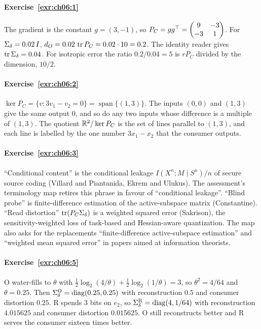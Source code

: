 
\paragraph{Exercise~\ref{exr:ch06:1}}
The gradient is the constant $g=(3,-1)$, so $P_C=gg^{\top}=\begin{pmatrix}9&-3\\-3&1\end{pmatrix}$. For $\Sigma_\delta=0.02\,I$, $d_O=0.02\,\operatorname{tr} P_C=0.02\cdot10=0.2$. The identity reader gives $\operatorname{tr}\Sigma_\delta=0.04$. For isotropic error the ratio $0.2/0.04=5$ is $	r P_C$ divided by the dimension, $10/2$.

\paragraph{Exercise~\ref{exr:ch06:2}}
$\ker P_C=\{v: 3v_1-v_2=0\}=\operatorname{span}\{(1,3)\}$. The inputs $(0,0)$ and $(1,3)$ give the same output $0$, and so do any two inputs whose difference is a multiple of $(1,3)$. The quotient $\mathbb{R}^2/\operatorname{ker} P_C$ is the set of lines parallel to $(1,3)$, and each line is labelled by the one number $3x_1-x_2$ that the consumer outputs.

\paragraph{Exercise~\ref{exr:ch06:3}}
``Conditional content'' is the conditional leakage $I(X^n;M\mid S^n)/n$ of secure source coding (Villard and Piantanida, Ekrem and Ulukus). The assessment's terminology map retires this phrase in favour of ``conditional leakage''. ``Blind probe'' is finite-difference estimation of the active-subspace matrix (Constantine). ``Read distortion'' $\operatorname{tr}(P_C\Sigma_\delta)$ is a weighted squared error (Sakrison), the sensitivity-weighted loss of task-based and Hessian-aware quantization. The map also asks for the replacements ``finite-difference active-subspace estimation'' and ``weighted mean squared error'' in papers aimed at information theorists.

\paragraph{Exercise~\ref{exr:ch06:5}}
O water-fills to $\theta$ with $\tfrac12\log_2(4/\theta)+\tfrac12\log_2(1/\theta)=3$, so $\theta^2=4/64$ and $\theta=0.25$. Then $\Sigma_\delta^{\mathrm O}=\operatorname{diag}(0.25,0.25)$ with reconstruction $0.5$ and consumer distortion $0.25$. R spends $3$ bits on $e_2$, so $\Sigma_\delta^{\mathrm R}=\operatorname{diag}(4,1/64)$ with reconstruction $4.015625$ and consumer distortion $0.015625$. O still reconstructs better and R serves the consumer sixteen times better.

